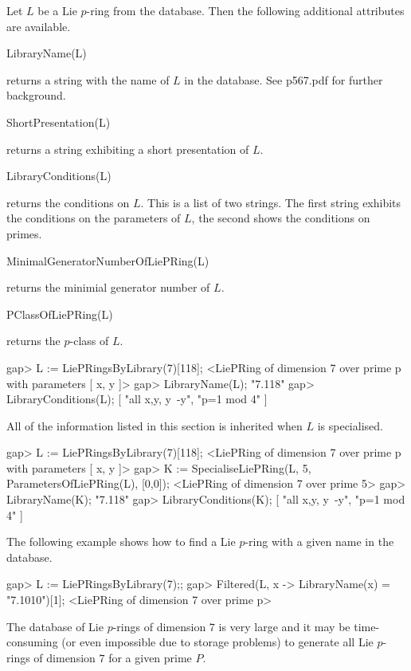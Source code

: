 
Let $L$ be a Lie $p$-ring from the database. Then the following additional
attributes are available. 

\> LibraryName(L)

returns a string with the name of $L$ in the database. See p567.pdf for
further background.

\> ShortPresentation(L)

returns a string exhibiting a short presentation of $L$.

\> LibraryConditions(L)

returns the conditions on $L$. This is a list of two strings. The first
string exhibits the conditions on the parameters of $L$, the second shows
the conditions on primes.

\> MinimalGeneratorNumberOfLiePRing(L)

returns the minimial generator number of $L$.

\> PClassOfLiePRing(L)

returns the $p$-class of $L$.

\beginexample
gap> L := LiePRingsByLibrary(7)[118];
<LiePRing of dimension 7 over prime p with parameters [ x, y ]>
gap> LibraryName(L);
"7.118"
gap> LibraryConditions(L);
[ "all x,y, y~-y", "p=1 mod 4" ]
\endexample

All of the information listed in this section is inherited when $L$
is specialised.

\beginexample
gap> L := LiePRingsByLibrary(7)[118];
<LiePRing of dimension 7 over prime p with parameters [ x, y ]>
gap> K := SpecialiseLiePRing(L, 5, ParametersOfLiePRing(L), [0,0]);
<LiePRing of dimension 7 over prime 5>
gap> LibraryName(K);
"7.118"
gap> LibraryConditions(K);
[ "all x,y, y~-y", "p=1 mod 4" ]
\endexample

The following example shows how to find a Lie $p$-ring with a 
given name in the database.

\beginexample
gap> L := LiePRingsByLibrary(7);;
gap> Filtered(L, x -> LibraryName(x) = "7.1010")[1];
<LiePRing of dimension 7 over prime p> 
\endexample


The database of Lie $p$-rings of dimension $7$ is very large and it may
be time-consuming (or even impossible due to storage problems) to generate
all Lie $p$-rings of dimension $7$ for a given prime $P$. 


